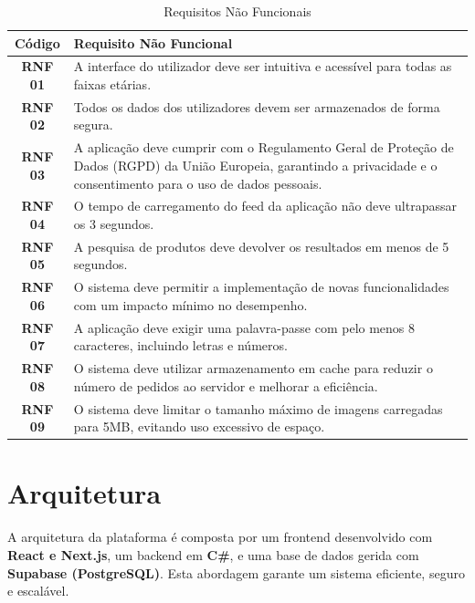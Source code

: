 \documentclass[a4paper, 12pt]{article} %
\begin{document}
\begin{table}[H]
	\centering
	\renewcommand{\arraystretch}{1.3}
	\begin{tabular}{|c|p{12cm}|}
		\hline
		\textbf{Código} & \textbf{Requisito Não Funcional} \\
		\hline
		\textbf{RNF 01} & A interface do utilizador deve ser intuitiva e acessível para todas as faixas etárias. \\
		\hline
		\textbf{RNF 02} & Todos os dados dos utilizadores devem ser armazenados de forma segura. \\
		\hline
		\textbf{RNF 03} & 	A aplicação deve cumprir com o Regulamento Geral de Proteção de Dados (RGPD) da União Europeia, garantindo a privacidade e o consentimento para o uso de dados pessoais. \\
		\hline
		\textbf{RNF 04} & O tempo de carregamento do feed da aplicação não deve ultrapassar os 3 segundos. \\
		\hline
		\textbf{RNF 05} & A pesquisa de produtos deve devolver os resultados em menos de 5 segundos.\\
		\hline
		\textbf{RNF 06} & O sistema deve permitir a implementação de novas funcionalidades com um impacto mínimo no desempenho. \\
		\hline
		\textbf{RNF 07} & A aplicação deve exigir uma palavra-passe com pelo menos 8 caracteres, incluindo letras e números. \\
		\hline
		\textbf{RNF 08} & O sistema deve utilizar armazenamento em cache para reduzir o número de pedidos ao servidor e melhorar a eficiência. \\
		\hline
		\textbf{RNF 09} & O sistema deve limitar o tamanho máximo de imagens carregadas para 5MB, evitando uso excessivo de espaço. \\
		\hline
	\end{tabular}
	\caption{Requisitos Não Funcionais}
	\label{tab:requisitos_nao_funcionais}
\end{table}


\newpage

\section{Arquitetura}
A arquitetura da plataforma é composta por um frontend desenvolvido com \textbf{React e Next.js}, um backend em \textbf{C\#}, e uma base de dados gerida com \textbf{Supabase (PostgreSQL)}. Esta abordagem garante um sistema eficiente, seguro e escalável.
\end{document}
